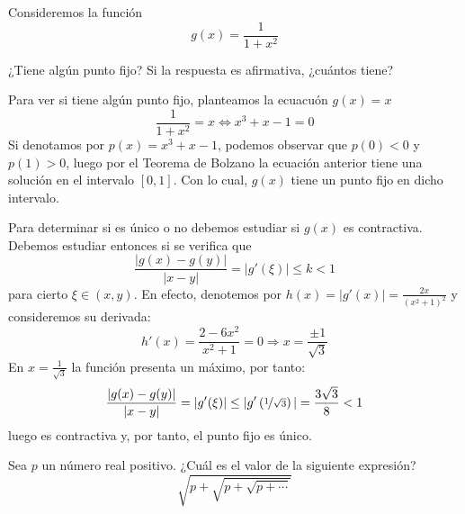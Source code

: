     \begin{ejer}
    Consideremos la función 
    $$g(x)=\frac{1}{1+x^2}$$
    \item[a)]¿Tiene algún punto fijo? Si la respuesta es afirmativa, ¿cuántos tiene?
    \end{ejer}
    \begin{sol}
    \item[a)] Para ver si tiene algún punto fijo, planteamos la ecuacuón $g(x)=x$
    $$\frac{1}{1+x^2}=x\Longleftrightarrow x^3+x-1=0$$
    Si denotamos por $p(x)=x^3+x-1$, podemos observar que $p(0)<0$ y $p(1)>0$, luego por el Teorema de Bolzano la ecuación anterior tiene una solución en el intervalo $[0,1]$. Con lo cual, $g(x)$ tiene un punto fijo en dicho intervalo.

    Para determinar si es único o no debemos estudiar si $g(x)$ es contractiva. Debemos estudiar entonces si se verifica que
    $$\frac{|g(x)-g(y)|}{|x-y|}=|g'(\xi)|\leq k< 1$$
    para cierto $\xi\in(x,y)$. En efecto, denotemos por
    $h(x)=|g'(x)|=\frac{2x}{(x^2+1)^2}$ y consideremos su derivada:
    $$h'(x)=\frac{2-6x^2}{x^2+1}=0\Longrightarrow x=\frac{\pm 1}{\sqrt{3}}$$
    En $x=\frac{1}{\sqrt{3}}$ la función presenta un máximo, por tanto:
    $$\frac{|g(x)-g(y)|}{|x-y|}=|g'(\xi)|\leq |g'\left(\nicefrac{1}{\sqrt{3}}\right)|=\frac{3\sqrt{3}}{8}<1$$
    luego es contractiva y, por tanto, el punto fijo es único.
    
    
    \end{sol}
 \begin{ejer}
  Sea $p$ un número real positivo. ¿Cuál es el valor de la siguiente expresión?
  $$\sqrt{p+\sqrt{p+\sqrt{p+\cdots}}}$$
 \end{ejer}
